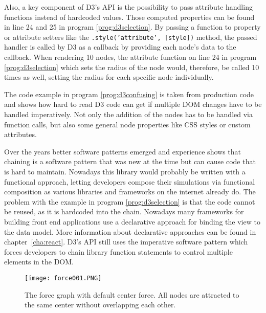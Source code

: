 Also, a key component of D3's API is the possibility to pass attribute handling functions instead of hardcoded values. Those computed properties can be found in line 24 and 25 in program \ref{prog:d3selection}. By passing a function to property or attribute setters like the \texttt{.style('attribute', [style])} method, the passed handler is called by D3 as a callback by providing each node's data to the callback. When rendering 10 nodes, the attribute function on line 24 in program \ref{prog:d3selection} which sets the radius of the node would, therefore, be called 10 times as well, setting the radius for each specific node individually.

The code example in program \ref{prog:d3confusing} is taken from production code and shows how hard to read D3 code can get if multiple DOM changes have to be handled imperatively. Not only the addition of the nodes has to be handled via function calls, but also some general node properties like CSS styles or custom attributes.

Over the years better software patterns emerged and experience shows that chaining is a software pattern that was new at the time but can cause code that is hard to maintain. Nowadays this library would probably be written with a functional approach, letting developers compose their simulations via functional composition as various libraries and frameworks on the internet already do. The problem with the example in program \ref{prog:d3selection} is that the code cannot be reused, as it is hardcoded into the chain. Nowadays many frameworks for building front end applications use a declarative approach for binding the view to the data model. More information about declarative approaches can be found in chapter~\ref{cha:react}. D3's API still uses the imperative software pattern which forces developers to chain library function statements to control multiple elements in the DOM.



\begin{figure}
  \centering
  \texttt{[image: force001.PNG]}
  \caption{The force graph with default center force. All nodes are attracted to the same center without overlapping each other.}
  \label{fig:force001}
\end{figure}

